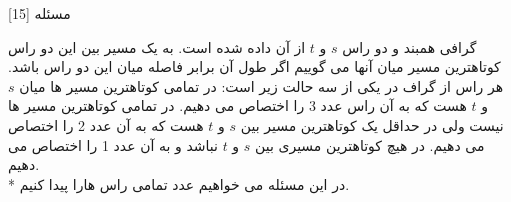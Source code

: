 ‌مسئله [15]


% 
%
%
% 

گرافی همبند و دو راس $s$ و $t$ از آن داده شده است. به یک مسیر بین این دو راس کوتاهترین مسیر میان آنها می گوییم اگر طول آن برابر فاصله میان این دو راس باشد.
هر راس از گراف در یکی از سه حالت زیر است:
در تمامی کوتاهترین مسیر ها میان $s$ و $t$ هست که به آن راس عدد 3 را اختصاص می دهیم.
در تمامی کوتاهترین مسیر ها نیست ولی در حداقل یک کوتاهترین مسیر بین $s$ و $t$ هست که به آن عدد 2 را اختصاص می دهیم.
در هیچ کوتاهترین مسیری بین $s$ و $t$ نباشد و به آن عدد 1 را اختصاص می دهیم.\\*
در این مسئله می خواهیم عدد تمامی راس هارا پیدا کنیم.

